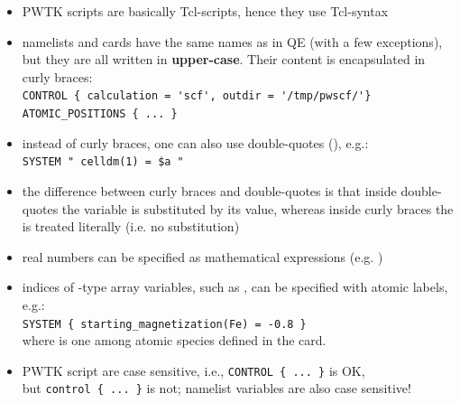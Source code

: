 \documentclass[landscape]{foils}
\def\red{\color{red}}
\begin{document}
\head{\red PWTK scripting: basics}
\vspace{-1em}
\begin{itemize}
\item PWTK scripts are basically Tcl-scripts, hence they use Tcl-syntax

  \vspace{-0.5em}
\item namelists and cards have the same names as in QE (with a few
  exceptions), but they are all written in {\bf upper-case}. Their
  content is encapsulated in curly braces:\\[0.5em]
  {\codecolor\verb+CONTROL { calculation = 'scf', outdir = '/tmp/pwscf/'}+}\\
  {\codecolor\verb+ATOMIC_POSITIONS { ... }+}

  \vspace{-0.5em}
\item instead of curly braces, one can also use double-quotes
  (), e.g.:\\[0.5em]
  {\codecolor\verb+SYSTEM " celldm(1) = $a "+}

  \vspace{-0.5em}
\item the difference between curly braces  and double-quotes
   is that inside double-quotes the variable  is
  substituted by its value, whereas inside curly braces the 
  is treated literally (i.e. no substitution)

  \vspace{-0.5em}
\item real numbers can be specified as mathematical
  expressions {\small (e.g. )}
    
  \vspace{-0.5em}
\item indices of -type array variables, such as
  , can be specified with
  atomic labels, e.g.:\\[0.5em]
  {\codecolor\verb+SYSTEM { starting_magnetization(Fe) = -0.8 }+}\\[0.5em]
  where  is one among atomic species defined in the  card.

  \vspace{-0.5em}  
\item PWTK script are case sensitive, i.e.,
  {\codecolor\verb+CONTROL { ... }+} is OK,\\
  but {\codecolor\verb+control { ... }+} is not; namelist variables
  are also case sensitive!


\end{itemize}
\end{document}
